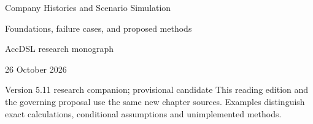 \documentclass[11pt,a4paper]{report}
\begin{document}
\hypersetup{pageanchor=false}
\begin{titlepage}
{\Huge Company Histories and Scenario Simulation\par}
\vspace{12mm}
{\Large Foundations, failure cases, and proposed methods\par}
\vspace{8mm}
AccDSL research monograph\par 26 October 2026\par Version 5.11 research companion; provisional candidate
\vfill
This reading edition and the governing proposal use the same new chapter sources. Examples distinguish exact calculations, conditional assumptions and unimplemented methods.
\end{titlepage}
\hypersetup{pageanchor=true}
\tableofcontents
\clearpage{}


























\clearpage\label{sim:body-end}

\begingroup\raggedright
\endgroup
\end{document}
